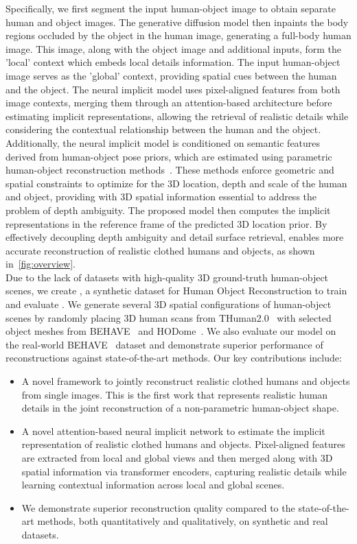 Specifically, we first segment the input human-object image to obtain separate human and object images. The generative diffusion model then inpaints the body regions occluded by the object in the human image, generating a full-body human image.  This image, along with the object image and additional inputs, form the 'local' context which embeds local details information. The input human-object image serves as the 'global' context, providing spatial cues between the human and the object. The neural implicit model uses pixel-aligned features from both image contexts, merging them through an attention-based architecture before estimating implicit representations, allowing the retrieval of realistic details while considering the contextual relationship between the human and the object.   
\\
Additionally, the neural implicit model is conditioned on semantic features derived from human-object pose priors, which are estimated using parametric human-object reconstruction methods~\cite{xie2022chore, zhang2020perceiving, nam2024contho, xie2023template_free}. These methods enforce geometric and spatial constraints to optimize for the 3D location, depth and scale of the human and object, providing \name with 3D spatial information essential to address the problem of depth ambiguity. The proposed model then computes the implicit representations in the reference frame of the predicted 3D location prior. 
By effectively decoupling depth ambiguity and detail surface retrieval, \name enables more accurate reconstruction of realistic clothed humans and objects, as shown in~\cref{fig:overview}.
\\
Due to the lack of datasets with high-quality 3D ground-truth human-object scenes, we create \dataname, a synthetic dataset for Human Object Reconstruction to train and evaluate \name. We 
generate several 3D spatial configurations of human-object scenes by randomly placing 3D human scans from THuman2.0~\cite{yu2021function4d} with selected object meshes from BEHAVE~\cite{bhatnagar2022behave} and HODome~\cite{zhang2023neuraldome}.  We also evaluate our model on the real-world BEHAVE~\cite{bhatnagar2022behave} dataset and demonstrate superior performance of reconstructions against state-of-the-art methods.
Our key contributions include: 
\begin{itemize}
  \item A novel framework to jointly reconstruct realistic clothed humans and objects from single images. This is the first work that represents realistic human details in the joint reconstruction of a non-parametric human-object shape.
  \item A novel attention-based neural implicit network to estimate the implicit representation of realistic clothed humans and objects. Pixel-aligned features are extracted from local and global views and then merged along with 3D spatial information via transformer encoders, capturing realistic details while learning contextual information across local and global scenes.
  \item We demonstrate superior reconstruction quality compared to the state-of-the-art methods, both quantitatively and qualitatively, on synthetic and real datasets. 
\end{itemize}